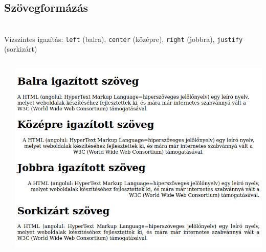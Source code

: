 \subsection{Szövegformázás}

\begin{frame}
  \begin{description}[m]
    \item[\texttt{text-align}] \hfill \\ Vízszintes igazítás: \texttt{left} (balra), \texttt{center} (középre), \texttt{right} (jobbra), \texttt{justify} (sorkizárt)
  \end{description}
  \begin{columns}[c]
      \begin{exampleblock}{}
        \tiny
        
        
      \end{exampleblock}
      \includegraphics[width=\textwidth]{vizszintes.png}
  \end{columns}
\end{frame}

